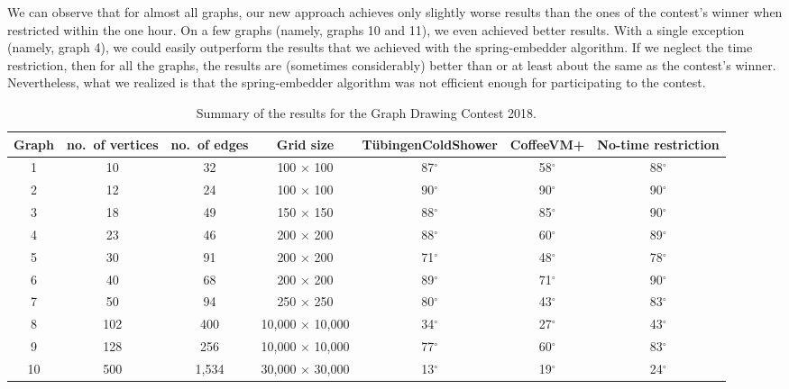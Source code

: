 \documentclass{comjnl}
\begin{document}
We can observe that for almost all graphs, our new approach achieves only slightly worse results than the ones of the contest's winner when restricted within the one hour. On a few graphs (namely, graphs 10 and 11), we even achieved better results. With a single exception (namely, graph 4), we could easily outperform the results that we achieved with the spring-embedder algorithm. If we neglect the time restriction, then for all the graphs, the results are (sometimes considerably) better than or at least about the same as the contest's winner. Nevertheless, what we realized is that the spring-embedder algorithm was not efficient enough for participating to the contest.

\begin{table}
\caption{Summary of the results for the Graph Drawing Contest 2018.}
\centering
\begin{adjustbox}{width=1\textwidth}
\begin{tabular}{c|c|c|c|c|c|c}
\toprule
\rowcolor{gray!30!} Graph & no.~of vertices & no.~of edges  & Grid size & T\"ubingenColdShower & CoffeeVM+ & No-time restriction \\
\midrule
\rowcolor{gray!30!} 1  & 10    & 32    & 100 $\times$ 100             & 87$^\circ$ & 58$^\circ$ & 88$^\circ$\\
\rowcolor{gray!00!} 2  & 12    & 24    & 100 $\times$ 100             & 90$^\circ$ & 90$^\circ$ & 90$^\circ$\\
\rowcolor{gray!30!} 3  & 18    & 49    & 150 $\times$ 150             & 88$^\circ$ & 85$^\circ$ & 90$^\circ$\\
\rowcolor{gray!00!} 4  & 23    & 46    & 200 $\times$ 200             & 88$^\circ$ & 60$^\circ$ & 89$^\circ$\\
\rowcolor{gray!30!} 5  & 30    & 91    & 200 $\times$ 200             & 71$^\circ$ & 48$^\circ$ & 78$^\circ$\\
\rowcolor{gray!00!} 6  & 40    & 68    & 200 $\times$ 200             & 89$^\circ$ & 71$^\circ$ & 90$^\circ$\\
\rowcolor{gray!30!} 7  & 50    & 94    & 250 $\times$ 250             & 80$^\circ$ & 43$^\circ$ & 83$^\circ$\\
\rowcolor{gray!00!} 8  & 102   & 400   & 10,000 $\times$ 10,000       & 34$^\circ$ & 27$^\circ$ & 43$^\circ$\\
\rowcolor{gray!30!} 9  & 128   & 256   & 10,000 $\times$ 10,000       & 77$^\circ$ & 60$^\circ$ & 83$^\circ$\\
\rowcolor{gray!00!} 10 & 500   & 1,534 & 30,000 $\times$ 30,000       & 13$^\circ$ & 19$^\circ$ & 24$^\circ$\\

\end{tabular}
\end{adjustbox}
\end{table}
\end{document}
